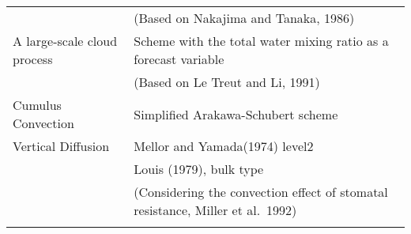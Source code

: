\begin{longtable}[]{@{}ll@{}}
\begin{minipage}[t]{0.47\columnwidth}
\strut
\end{minipage} & \begin{minipage}[t]{0.47\columnwidth}\raggedright
(Based on Nakajima and Tanaka, 1986)\strut
\end{minipage}\tabularnewline
\begin{minipage}[t]{0.47\columnwidth}\raggedright
A large-scale cloud process\strut
\end{minipage} & \begin{minipage}[t]{0.47\columnwidth}\raggedright
Scheme with the total water mixing ratio as a forecast variable\strut
\end{minipage}\tabularnewline
\begin{minipage}[t]{0.47\columnwidth}\raggedright
\strut
\end{minipage} & \begin{minipage}[t]{0.47\columnwidth}\raggedright
(Based on Le Treut and Li, 1991)\strut
\end{minipage}\tabularnewline
\begin{minipage}[t]{0.47\columnwidth}\raggedright
Cumulus Convection\strut
\end{minipage} & \begin{minipage}[t]{0.47\columnwidth}\raggedright
Simplified Arakawa-Schubert scheme\strut
\end{minipage}\tabularnewline
\begin{minipage}[t]{0.47\columnwidth}\raggedright
Vertical Diffusion\strut
\end{minipage} & \begin{minipage}[t]{0.47\columnwidth}\raggedright
Mellor and Yamada(1974) level2\strut
\end{minipage}\tabularnewline
\begin{minipage}[t]{0.47\columnwidth}\raggedright
\strut
\end{minipage} & \begin{minipage}[t]{0.47\columnwidth}\raggedright
Louis (1979), bulk type\strut
\end{minipage}\tabularnewline
\begin{minipage}[t]{0.47\columnwidth}\raggedright
\strut
\end{minipage} & \begin{minipage}[t]{0.47\columnwidth}\raggedright
(Considering the convection effect of stomatal resistance, Miller et
al.~1992)\strut
\end{minipage}\tabularnewline
\begin{minipage}[t]{0.47\columnwidth}\raggedright

\end{minipage}
\end{longtable}
